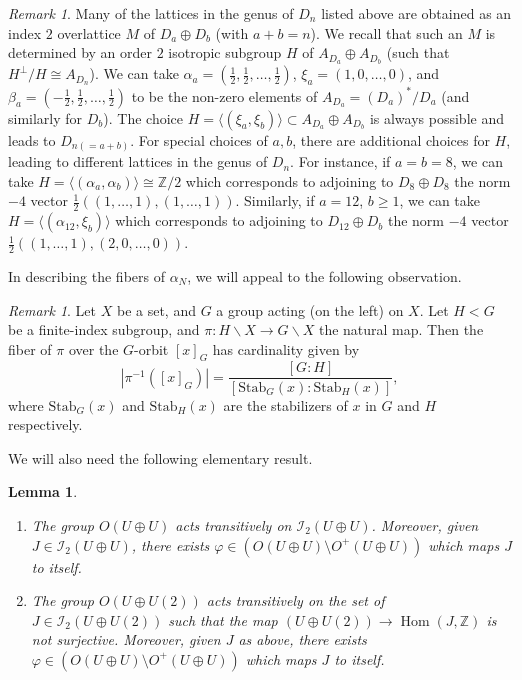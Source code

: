 \documentclass[11pt]{amsart}
\numberwithin{equation}{section}
\theoremstyle{plain}
\newtheorem{lemma}[theorem]{Lemma}
\theoremstyle{remark}
\newtheorem{remark}[theorem]{Remark}
\theoremstyle{definition}
\def\Hom{\operatorname{Hom}}
\newcommand{\bZ}{\mathbb{Z}}
\newcommand{\Stab}{\mathrm{Stab}}
\newcommand{\cI}{{\mathscr I}}
\newcommand{\ZZ}{{\mathbb Z}}
\begin{document}
 \begin{remark}
 Many of the lattices in the genus of $D_n$  listed above are obtained as an index $2$ overlattice $M$ of $D_{a}\oplus D_{b}$ (with $a+b=n$). We recall that such an $M$ is determined by an order $2$ isotropic subgroup $H$ of $A_{D_a}\oplus A_{D_b}$ (such that $H^\perp/H\cong A_{D_n}$). We can take  $\alpha_{a}= (\frac{1}{2},\frac{1}{2},\dots, \frac{1}{2})$, $\xi_a=(1,0,\dots,0)$, and $\beta_{a}= (-\frac{1}{2},\frac{1}{2},\dots, \frac{1}{2})$ to be the non-zero elements of $A_{D_a}=(D_a)^*/D_a$ (and similarly for $D_b$).  The choice $H=\langle (\xi_a,\xi_b)\rangle\subset A_{D_a}\oplus A_{D_b}$ is always possible and leads to $D_{n(=a+b)}$. For special choices of $a,b$, there are additional choices for $H$, leading to different lattices in the genus of $D_n$. For instance, if $a=b=8$, we can take $H=\langle (\alpha_a,\alpha_b)\rangle\cong \bZ/2$ which corresponds to adjoining to $D_8\oplus D_8$ the norm $-4$ vector $\frac{1}{2}((1,\dots,1),(1,\dots,1))$.  Similarly, if $a=12$, $b\ge 1$, we can take $H=\langle (\alpha_{12},\xi_b)\rangle$ which corresponds to adjoining to $D_{12}\oplus D_b$ the norm $-4$ vector $\frac{1}{2}((1,\dots, 1), (2,0,\dots,0))$. 
 \end{remark}
%
In describing the fibers of   $\alpha_N$, we will appeal to the following observation.
%
\begin{remark}\label{rmk:fibercard}
%
Let $X$ be  a set, and  $G$   a group acting (on the left) on $X$. Let $H<G$ be a finite-index subgroup, and $\pi\colon H\backslash X\to G\backslash X$  the natural map. Then the  fiber of $\pi$ over the $G$-orbit $[x]_G$ has cardinality given by
%
\begin{equation*}
%
|\pi^{-1}([x]_G )|=\frac{[G:H]}{[\Stab_G(x):\Stab_H(x)]},
%
\end{equation*}
%
where $\Stab_G(x)$ and $\Stab_H(x)$ are the stabilizers of $x$ in $G$ and $H$ respectively. 
%
\end{remark}
%
We will also need the following elementary result.  
%
\begin{lemma}\label{lmm:minilemma}
%
\begin{enumerate}
%
\item
%
The group  $O(U\oplus U)$ acts transitively on $\cI_2(U\oplus U)$. 
Moreover, given $J\in \cI_2(U\oplus U)$,  there exists $\varphi\in(O(U\oplus U)\setminus O^{+}(U\oplus U))$ which maps $J$ to itself.
%
\item
%
The group  $O(U\oplus U(2))$ acts transitively on the set of $J\in\cI_2(U\oplus U(2))$ such that the map $(U\oplus U(2))\to\Hom(J,\ZZ)$ is not surjective. Moreover, given $J$ as above,  there exists $\varphi\in(O(U\oplus U)\setminus O^{+}(U\oplus U))$ which maps $J$ to itself. 
% 
\end{enumerate}
%
%
\end{lemma}
\end{document}
